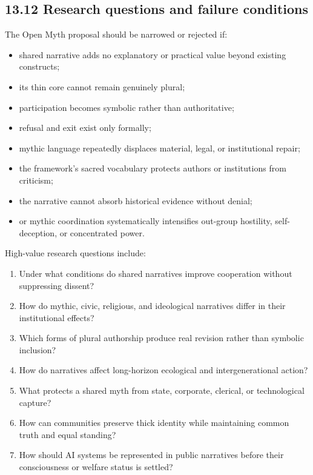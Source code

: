\documentclass[
  11pt,
]{article}
\providecommand{\tightlist}{%
  \setlength{\itemsep}{0pt}\setlength{\parskip}{0pt}}
\begin{document}
\subsection{13.12 Research questions and failure
conditions}\label{research-questions-and-failure-conditions}

The Open Myth proposal should be narrowed or rejected if:

\begin{itemize}
\tightlist
\item
  shared narrative adds no explanatory or practical value beyond
  existing constructs;
\item
  its thin core cannot remain genuinely plural;
\item
  participation becomes symbolic rather than authoritative;
\item
  refusal and exit exist only formally;
\item
  mythic language repeatedly displaces material, legal, or institutional
  repair;
\item
  the framework's sacred vocabulary protects authors or institutions
  from criticism;
\item
  the narrative cannot absorb historical evidence without denial;
\item
  or mythic coordination systematically intensifies out-group hostility,
  self-deception, or concentrated power.
\end{itemize}

High-value research questions include:

\begin{enumerate}
\def\labelenumi{\arabic{enumi}.}
\tightlist
\item
  Under what conditions do shared narratives improve cooperation without
  suppressing dissent?
\item
  How do mythic, civic, religious, and ideological narratives differ in
  their institutional effects?
\item
  Which forms of plural authorship produce real revision rather than
  symbolic inclusion?
\item
  How do narratives affect long-horizon ecological and intergenerational
  action?
\item
  What protects a shared myth from state, corporate, clerical, or
  technological capture?
\item
  How can communities preserve thick identity while maintaining common
  truth and equal standing?
\item
  How should AI systems be represented in public narratives before their
  consciousness or welfare status is settled?
\end{enumerate}
\end{document}
